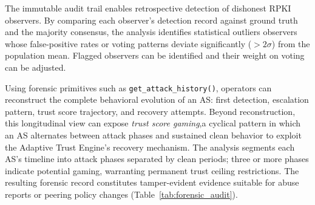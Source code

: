{
The immutable audit trail enables retrospective detection of dishonest RPKI observers. By comparing each observer's detection record against ground truth and the majority consensus, the analysis identifies statistical outliers observers whose false-positive rates or voting patterns deviate significantly (${>}2\sigma$) from the population mean. Flagged observers can be identified and their weight on voting can be adjusted.

Using forensic primitives such as \texttt{get\_attack\_history()}, operators can reconstruct the complete behavioral evolution of an AS: first detection, escalation pattern, trust score trajectory, and recovery attempts. Beyond reconstruction, this longitudinal view can expose \textit{trust score gaming},a cyclical pattern in which an AS alternates between attack phases and sustained clean behavior to exploit the Adaptive Trust Engine's recovery mechanism. The analysis segments each AS's timeline into attack phases separated by clean periods; three or more phases indicate potential gaming, warranting permanent trust ceiling restrictions. The resulting forensic record constitutes tamper-evident evidence suitable for abuse reports or peering policy changes (Table~\ref{tab:forensic_audit}).
}
